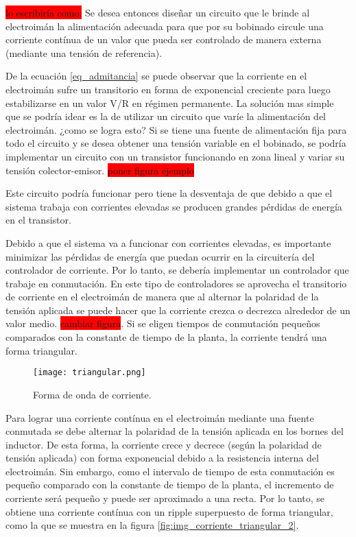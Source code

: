\colorbox{red}{lo escribiría como:}
Se desea entonces diseñar un circuito que le brinde al electroimán la alimentación adecuada para que por su bobinado circule una corriente contínua de un valor que pueda ser controlado de manera externa (mediante una tensión de referencia).

De la ecuación \ref{eq_admitancia} se puede observar que la corriente en el electroimán sufre un transitorio en forma de exponencial creciente para luego estabilizarse en un valor V/R en régimen permanente. La solución mas simple que se podría idear es la de utilizar un circuito que varíe la alimentación del electroimán. ¿como se logra esto? Si se tiene una fuente de alimentación fija para todo el circuito y se desea obtener una tensión variable en el bobinado, se podría implementar un circuito con un transistor funcionando en zona lineal y variar su tensión colector-emisor. \colorbox{red}{poner figura ejemplo}

Este circuito podría funcionar pero tiene la desventaja de que debido a que el sistema trabaja con corrientes elevadas se producen grandes pérdidas de energía en el transistor. 

Debido a que el sistema va a funcionar con corrientes elevadas, es importante minimizar las pérdidas de energía que puedan ocurrir en la circuitería del controlador de corriente. Por lo tanto, se debería implementar un controlador que trabaje en conmutación.  En este tipo de controladores se aprovecha el transitorio de corriente en el electroimán de manera que al alternar la polaridad de la tensión aplicada se puede hacer que la corriente crezca o decrezca alrededor de un valor medio. \colorbox{red}{cambiar figura}. Si se eligen tiempos de conmutación pequeños comparados con la constante de tiempo de la planta, la corriente tendrá una forma triangular.

\begin{figure}[H]
	\centering
	\texttt{[image: triangular.png]}
	\caption{Forma de onda de corriente.}
	\label{fig:img_corriente_triangular}
\end{figure}


\noindent Para lograr una corriente contínua en el electroimán mediante una fuente conmutada se debe alternar la polaridad de la tensión aplicada en los bornes del inductor. De esta forma, la corriente crece y decrece (según la polaridad de tensión aplicada) con forma exponencial debido a la resistencia interna del electroimán. Sin embargo, como el intervalo de tiempo de esta conmutación es pequeño comparado con la constante de tiempo de la planta, el incremento de corriente será pequeño y puede ser aproximado a una recta. Por lo tanto, se obtiene una corriente contínua con un ripple superpuesto de forma triangular, como la que se muestra en la figura \ref{fig:img_corriente_triangular_2}. 

